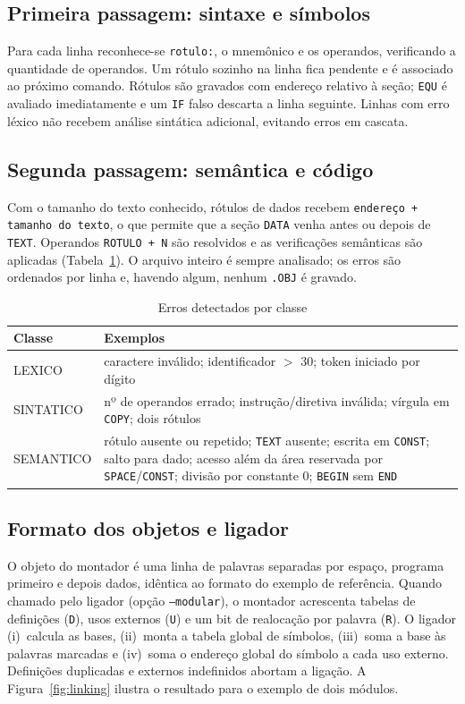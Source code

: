\documentclass[conference]{IEEEtran}
\begin{document}
\subsection{Primeira passagem: sintaxe e símbolos}
Para cada linha reconhece-se \texttt{rotulo:}, o mnemônico e os operandos, verificando a quantidade de operandos. Um rótulo sozinho na linha fica pendente e é associado ao próximo comando. Rótulos são gravados com endereço relativo à seção; \texttt{EQU} é avaliado imediatamente e um \texttt{IF} falso descarta a linha seguinte. Linhas com erro léxico não recebem análise sintática adicional, evitando erros em cascata.

\subsection{Segunda passagem: semântica e código}
Com o tamanho do texto conhecido, rótulos de dados recebem \texttt{endereço + tamanho do texto}, o que permite que a seção \texttt{DATA} venha antes ou depois de \texttt{TEXT}. Operandos \texttt{ROTULO + N} são resolvidos e as verificações semânticas são aplicadas (Tabela~\ref{tab:errors}). O arquivo inteiro é sempre analisado; os erros são ordenados por linha e, havendo algum, nenhum \texttt{.OBJ} é gravado.

\begin{table}[!htbp]
\centering
\caption{Erros detectados por classe}\label{tab:errors}
\begin{tabular}{p{2.1cm} p{4.9cm}}
\toprule
\textbf{Classe} & \textbf{Exemplos}\\
\midrule
LEXICO & caractere inválido; identificador $>$ 30; token iniciado por dígito\\
SINTATICO & nº de operandos errado; instrução/diretiva inválida; vírgula em \texttt{COPY}; dois rótulos\\
SEMANTICO & rótulo ausente ou repetido; \texttt{TEXT} ausente; escrita em \texttt{CONST}; salto para dado; acesso além da área reservada por \texttt{SPACE}/\texttt{CONST}; divisão por constante 0; \texttt{BEGIN} sem \texttt{END}\\
\bottomrule
\end{tabular}
\end{table}

\subsection{Formato dos objetos e ligador}
O objeto do montador é uma linha de palavras separadas por espaço, programa primeiro e depois dados, idêntica ao formato do exemplo de referência. Quando chamado pelo ligador (opção \texttt{--modular}), o montador acrescenta tabelas de definições (\texttt{D}), usos externos (\texttt{U}) e um bit de realocação por palavra (\texttt{R}). O ligador (i)~calcula as bases, (ii)~monta a tabela global de símbolos, (iii)~soma a base às palavras marcadas e (iv)~soma o endereço global do símbolo a cada uso externo. Definições duplicadas e externos indefinidos abortam a ligação. A Figura~\ref{fig:linking} ilustra o resultado para o exemplo de dois módulos.
\end{document}
